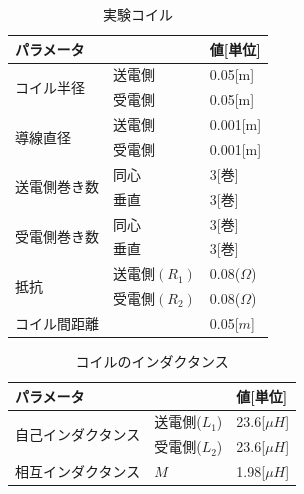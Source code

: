 \documentclass[12pt]{jarticle}
\begin{document}
\begin{table}[h]
	\caption{実験コイル}
	\centering
	\label{tab:koiru}
	\begin{tabular}{|l|l|l|}
		\hline
		\multicolumn{2}{|l|}{パラメータ}          & 値{[}単位{]}                 \\ \hline
		\multirow{2}{*}{コイル半径}  & 送電側        & 0.05{[}m{]}               \\ \cline{2-3} 
		& 受電側        & 0.05{[}m{]}               \\ \hline
		\multirow{2}{*}{導線直径}   & 送電側        & 0.001{[}m{]}              \\ \cline{2-3} 
		& 受電側        & 0.001{[}m{]}              \\ \hline
		\multirow{2}{*}{送電側巻き数} & 同心         & 3{[}巻{]}                  \\ \cline{2-3} 
		& 垂直         & 3{[}巻{]}                  \\ \hline
		\multirow{2}{*}{受電側巻き数} & 同心         & 3{[}巻{]}                  \\ \cline{2-3} 
		& 垂直         & 3{[}巻{]}                  \\ \hline
		\multirow{2}{*}{抵抗}     & 送電側$(R_1)$ & 0.08($\Omega$) \\ \cline{2-3} 
		& 受電側$(R_2)$ & 0.08($\Omega$) \\ \hline
		\multicolumn{2}{|l|}{コイル間距離}      & 0.05{[}$m${]}                   \\ \hline
	\end{tabular}
\end{table}
\begin{table}[h]
	\centering
	\caption{コイルのインダクタンス}
	\label{tab:indact}
	\begin{tabular}{|l|l|l|}
		\hline
		\multicolumn{2}{|l|}{パラメータ}             & 値{[}単位{]}       \\ \hline
		\multirow{2}{*}{自己インダクタンス} & 送電側($L_1$) & 23.6{[}$\mu H${]} \\ \cline{2-3} 
		& 受電側($L_2$) & 23.6{[}$\mu H${]} \\ \hline
		相互インダクタンス                  & $M$        & 1.98{[}$\mu H${]} \\ \hline
	\end{tabular}
\end{table}
\end{document}
